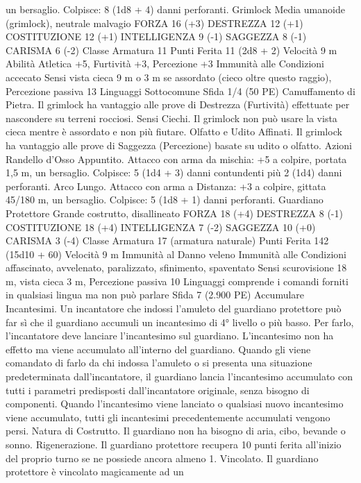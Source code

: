 \begin{multicols}{2}
un bersaglio.
Colpisce: 8 (1d8 + 4) danni perforanti.
Grimlock
Media umanoide (grimlock), neutrale malvagio
FORZA 16 (+3)
DESTREZZA 12 (+1)
COSTITUZIONE 12 (+1)
INTELLIGENZA 9 (-1)
SAGGEZZA 8 (-1)
CARISMA 6 (-2)
Classe Armatura 11
Punti Ferita 11 (2d8 + 2)
Velocità 9 m
Abilità Atletica +5, Furtività +3, Percezione +3
Immunità alle Condizioni accecato
Sensi vista cieca 9 m o 3 m se assordato (cieco oltre questo
raggio), Percezione passiva 13
Linguaggi Sottocomune
Sfida 1/4 (50 PE)
Camuffamento di Pietra. Il grimlock ha vantaggio alle prove di
Destrezza (Furtività) effettuate per nascondere su terreni
rocciosi.
Sensi Ciechi. Il grimlock non può usare la vista cieca mentre è
assordato e non più fiutare.
Olfatto e Udito Affinati. Il grimlock ha vantaggio alle prove di
Saggezza (Percezione) basate su udito o olfatto.
Azioni
Randello d’Osso Appuntito. Attacco con arma da mischia: +5 a
colpire, portata 1,5 m, un bersaglio.
Colpisce: 5 (1d4 + 3) danni contundenti più 2 (1d4) danni
perforanti.
Arco Lungo. Attacco con arma a Distanza: +3 a colpire, gittata
45/180 m, un bersaglio.
Colpisce: 5 (1d8 + 1) danni perforanti.
Guardiano Protettore
Grande costrutto, disallineato
FORZA 18 (+4)
DESTREZZA 8 (-1)
COSTITUZIONE 18 (+4)
INTELLIGENZA 7 (-2)
SAGGEZZA 10 (+0)
CARISMA 3 (-4)
Classe Armatura 17 (armatura naturale)
Punti Ferita 142 (15d10 + 60)
Velocità 9 m
Immunità al Danno veleno
Immunità alle Condizioni affascinato, avvelenato, paralizzato,
sfinimento, spaventato
Sensi scurovisione 18 m, vista cieca 3 m, Percezione passiva 10
Linguaggi comprende i comandi forniti in qualsiasi lingua ma
non può parlare
Sfida 7 (2.900 PE)
Accumulare Incantesimi. Un incantatore che indossi l’amuleto del
guardiano protettore può far sì che il guardiano accumuli un
incantesimo di 4° livello o più basso. Per farlo, l’incantatore deve
lanciare l’incantesimo sul guardiano. L’incantesimo non ha effetto
ma viene accumulato all’interno del guardiano. Quando gli viene
comandato di farlo da chi indossa l’amuleto o si presenta una
situazione predeterminata dall’incantatore, il guardiano lancia
l’incantesimo accumulato con tutti i parametri predisposti
dall’incantatore originale, senza bisogno di componenti. Quando
l’incantesimo viene lanciato o qualsiasi nuovo incantesimo viene
accumulato, tutti gli incantesimi precedentemente accumulati
vengono persi.
Natura di Costrutto. Il guardiano non ha bisogno di aria, cibo,
bevande o sonno.
Rigenerazione. Il guardiano protettore recupera 10 punti ferita
all’inizio del proprio turno se ne possiede ancora almeno 1.
Vincolato. Il guardiano protettore è vincolato magicamente ad un

\end{multicols}
